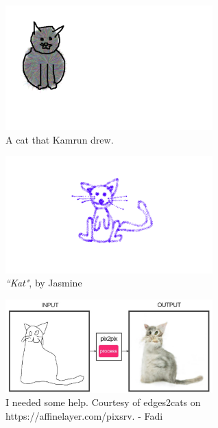 \begin{centering}
\begin{figure}
	\includegraphics[width=8cm]{cat742afer228.pdf}
  \caption{A cat that Kamrun drew.}
  \label{Cat draw by Kamrun}
\end{figure}




\begin{figure} \centering
    \includegraphics[width=8cm]{kat.pdf}
    \caption{\emph{``Kat"}, by Jasmine}
    \label{kat}
\end{figure}


\begin{figure}\centering
  \includegraphics[width=8cm]{cat-fadiwassaf.pdf}
  \caption{I needed some help. Courtesy of edges2cats on https://affinelayer.com/pixsrv. - Fadi}
  \label{cat-fadi}
\end{figure}




\end{centering}
